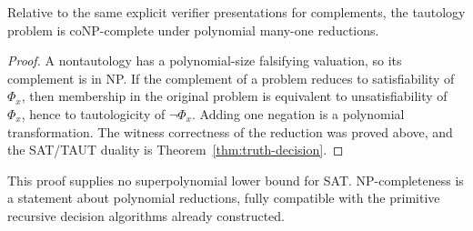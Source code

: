 \begin{corollary}\label{thm:taut-conp}
Relative to the same explicit verifier presentations for complements,
the tautology problem is coNP-complete under polynomial many-one reductions.
\end{corollary}
\begin{proof}
A nontautology has a polynomial-size falsifying valuation, so its complement
is in NP. If the complement of a problem reduces to satisfiability of
$\Phi_x$, then membership in the original problem is equivalent to
unsatisfiability of $\Phi_x$, hence to tautologicity of $\neg\Phi_x$.
Adding one negation is a polynomial transformation. The witness correctness
of the reduction was proved above, and the SAT/TAUT duality is
Theorem~\ref{thm:truth-decision}.
\end{proof}

This proof supplies no superpolynomial lower bound for SAT. NP-completeness
is a statement about polynomial reductions, fully compatible with the
primitive recursive decision algorithms already constructed.
